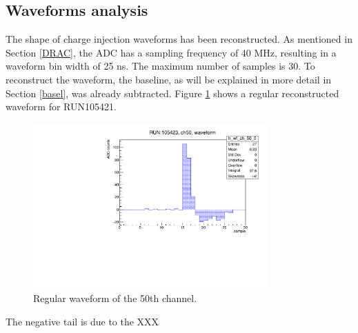 \subsection{Waveforms analysis}\label{wf}
The shape of charge injection waveforms has been reconstructed. As mentioned in Section \ref{DRAC}, 
the ADC has a sampling frequency of 40 MHz, resulting in a waveform bin width of 25 ns. 
The maximum number of samples is 30. To reconstruct the waveform, the baseline, as will be 
explained in more detail in Section \ref{basel}, was already subtracted.
Figure \ref{fig:normalwf} shows a regular reconstructed waveform for RUN105421.
\begin{figure}[!h]
  \centering
  \includegraphics[width=0.8\textwidth]{figures/pdf/wf_ch50_0.pdf}
  \caption{Regular waveform of the 50th channel.}
 \label{fig:normalwf}
\end{figure}
The negative tail is due to the XXX

